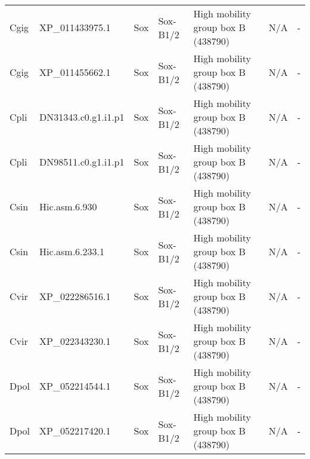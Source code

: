 \documentclass[../main.tex]{subfiles}
\begin{document}
\begin{landscape}
\begin{longtable}{lllllll}
		Cgig           & XP\_011433975.1       & Sox            & Sox-B1/2            & High mobility group box B (438790)          & N/A                                                                    & -                    \\
		Cgig           & XP\_011455662.1       & Sox            & Sox-B1/2            & High mobility group box B (438790)          & N/A                                                                    & -                    \\
		Cpli           & DN31343.c0.g1.i1.p1   & Sox            & Sox-B1/2            & High mobility group box B (438790)          & N/A                                                                    & -                    \\
		Cpli           & DN98511.c0.g1.i1.p1   & Sox            & Sox-B1/2            & High mobility group box B (438790)          & N/A                                                                    & -                    \\
		Csin           & Hic.asm.6.930         & Sox            & Sox-B1/2            & High mobility group box B (438790)          & N/A                                                                    & -                    \\
		Csin           & Hic.asm.6.233.1       & Sox            & Sox-B1/2            & High mobility group box B (438790)          & N/A                                                                    & -                    \\
		Cvir           & XP\_022286516.1       & Sox            & Sox-B1/2            & High mobility group box B (438790)          & N/A                                                                    & -                    \\
		Cvir           & XP\_022343230.1       & Sox            & Sox-B1/2            & High mobility group box B (438790)          & N/A                                                                    & -                    \\
		Dpol           & XP\_052214544.1       & Sox            & Sox-B1/2            & High mobility group box B (438790)          & N/A                                                                    & -                    \\
		Dpol           & XP\_052217420.1       & Sox            & Sox-B1/2            & High mobility group box B (438790)          & N/A                                                                    & -                    \\

\end{longtable}
\end{landscape}
\end{document}

